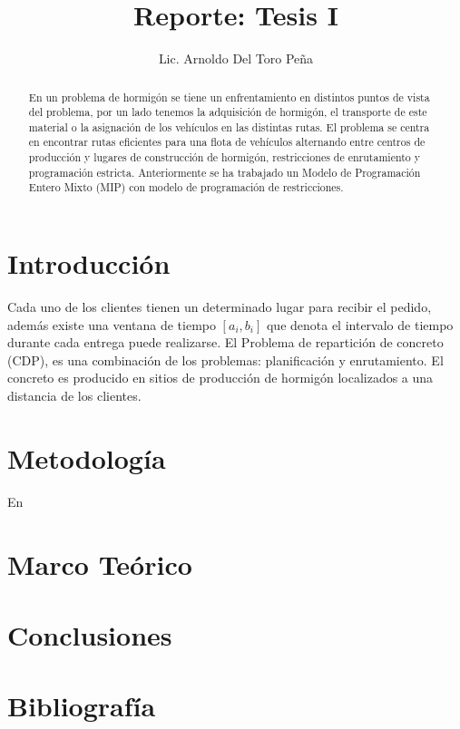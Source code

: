 \documentclass[12pt,letterpaper]{article}
\title{Reporte: Tesis I}
\author{Lic. Arnoldo Del Toro Peña}
\begin{document}
	\maketitle
	
	\begin{abstract}
		En un problema de hormigón se tiene un enfrentamiento en distintos puntos de vista del problema, por un lado tenemos la adquisición de hormigón, el transporte de este material o la asignación de los vehículos en las distintas rutas. El problema se centra en encontrar rutas eficientes para una flota de vehículos alternando entre centros de producción y lugares de construcción de hormigón, restricciones de enrutamiento y programación estricta. Anteriormente se ha trabajado un Modelo de Programación Entero Mixto (MIP) con modelo de programación de restricciones.
	\end{abstract}

	\begin{multicols}{2}
		
		\section{Introducci\'on}
		Cada uno de los clientes tienen un determinado lugar para recibir el pedido, además existe una ventana de tiempo $[a_i,b_i]$ que denota el intervalo de tiempo durante cada entrega puede realizarse. El Problema de repartición de concreto (CDP), es una combinación de los problemas: planificación y enrutamiento. El concreto es producido en sitios de producción de hormigón localizados a una distancia de los clientes.
		\section{Metodolog\'ia}
		En 
		\section{Marco Te\'orico}
		
		\section{Conclusiones}
		
	\end{multicols}

	\section{Bibliograf\'ia}
	
	
\end{document}
